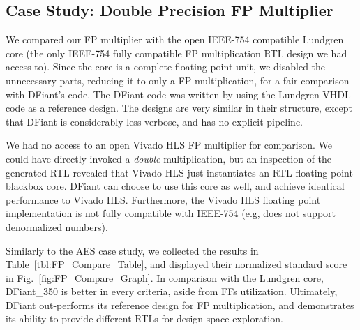           
\subsection{Case Study: Double Precision FP Multiplier}

We compared our FP multiplier with the open IEEE-754 compatible Lundgren core \cite{lundgren2014open} (the only IEEE-754 fully compatible FP multiplication RTL design we had access to). Since the core is a complete floating point unit, we disabled the unnecessary parts, reducing it to only a FP multiplication, for a fair comparison with DFiant's code. The DFiant code was written by using the Lundgren VHDL code as a reference design. The designs are very similar in their structure, except that DFiant is considerably less verbose, and has no explicit pipeline.

We had no access to an open Vivado HLS FP multiplier for comparison. We could have directly invoked a \textit{double} multiplication, but an inspection of the generated RTL revealed that Vivado HLS just instantiates an RTL floating point blackbox core. DFiant can choose to use this core as well, and achieve identical performance to Vivado HLS. Furthermore, the Vivado HLS floating point implementation is not fully compatible with IEEE-754 (e.g, does not support denormalized numbers).

Similarly to the AES case study, we collected the results in Table~\ref{tbl:FP_Compare_Table}, and displayed their normalized standard score in Fig.~\ref{fig:FP_Compare_Graph}. In comparison with the Lundgren core, DFiant\_350 is better in every criteria, aside from FFs utilization. Ultimately, DFiant out-performs its reference design for FP multiplication, and demonstrates its ability to provide different RTLs for design space exploration.

